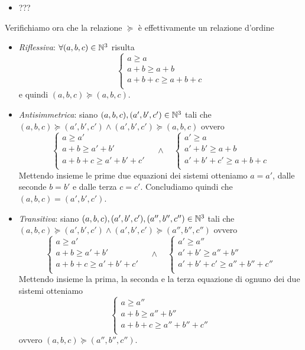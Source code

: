 \documentclass[a4paper]{article}\par \usepackage{style}\par
\begin{document}
\begin{itemize}[label=$ \Leftarrow $]
\item ???
\end{itemize}
Verifichiamo ora che la relazione $ \succeq $ è effettivamente un relazione d'ordine
\begin{itemize}
\item \emph{Riflessiva}: $ \forall (a, b, c) \in \mathbb{N}^3 $ risulta
  \[\begin{cases*}
      a \geq a \\
      a + b \geq a + b \\
      a + b + c \geq a + b + c \\
    \end{cases*}\]
  e quindi $ (a, b, c) \succeq (a, b, c) $.
\item \emph{Antisimmetrica}: siano $ (a, b, c), (a', b', c') \in \mathbb{N}^3 $ tali che $ (a, b, c) \succeq (a', b', c') \wedge (a', b', c') \succeq (a, b, c) $ ovvero
  \[\begin{cases*}
      a \geq a' \\
      a + b \geq a' + b' \\
      a + b + c \geq a' + b' + c' \\
    \end{cases*}
    \quad \wedge \quad
    \begin{cases*}
      a' \geq a \\
      a' + b' \geq a + b \\
      a' + b' + c' \geq a + b + c \\
    \end{cases*}\]
  Mettendo insieme le prime due equazioni dei sistemi otteniamo $ a = a' $, dalle seconde $ b = b' $ e dalle terza $ c = c' $. Concludiamo quindi che $ (a, b, c) = (a', b', c') $.
\item \emph{Transitiva}: siano $ (a, b, c), (a', b', c'), (a'', b'', c'') \in \mathbb{N}^3 $ tali che $ (a, b, c) \succeq (a', b', c') \wedge (a', b', c') \succeq (a'', b'', c'') $ ovvero
  \[\begin{cases*}
      a \geq a' \\
      a + b \geq a' + b' \\
      a + b + c \geq a' + b' + c' \\
    \end{cases*}
    \quad \wedge \quad
    \begin{cases*}
      a' \geq a'' \\
      a' + b' \geq a'' + b'' \\
      a' + b' + c' \geq a'' + b'' + c'' \\
    \end{cases*}\]
  Mettendo insieme la prima, la seconda e la terza equazione di ognuno dei due sistemi otteniamo
  \[\begin{cases*}
      a \geq a'' \\
      a + b \geq a'' + b'' \\
      a + b + c \geq a'' + b'' + c'' \\
    \end{cases*}\]
  ovvero $ (a, b, c) \succeq (a'', b'', c'') $.
\end{itemize}
\end{document}

